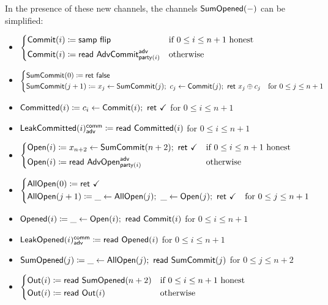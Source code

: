 \noindent In the presence of these new channels, the channels $\mathsf{SumOpened}(-)$ can be simplified:

\begin{itemize}
\item {\color{blue} $\begin{cases*} \Commit(i) \coloneqq \samp{\flip} & \text{if $0 \leq i \leq n+1$ honest} \\ \Commit(i) \coloneqq \read{\AdvCommit^\adv_{\party(i)}} & \text{otherwise} \end{cases*}$}
\item {\color{blue} $\begin{cases*} \SumCommit(0) \coloneqq \ret{\false} & \\ \SumCommit(j+1) \coloneqq x_j \leftarrow \SumCommit(j); \ c_j \leftarrow \Commit(j); \ \ret{x_j \oplus c_j} & \text{for $0 \leq j \leq n+1$} \end{cases*}$}
\item {\color{magenta} $\mathsf{Committed}(i) \coloneqq c_i \leftarrow \mathsf{Commit}(i); \ \mathsf{ret} \ \checkmark$ for $0 \leq i \leq n+1$}
\item {\color{magenta} $\mathsf{LeakCommitted}(i)^{\mathsf{comm}}_{\mathsf{adv}} \coloneqq \mathsf{read} \ \mathsf{Committed}(i)$ for $0 \leq i \leq n+1$}
\item {\color{teal} $\begin{cases*} \Open(i) \coloneqq x_{n+2} \leftarrow \SumCommit(n+2); \ \ret{\checkmark} & \text{if $0 \leq i \leq n+1$ honest} \\ \Open(i) \coloneqq \read{\AdvOpen^\adv_{\party(i)}} & \text{otherwise} \end{cases*}$}
\item {\color{teal} $\begin{cases*} \AllOpen(0) \coloneqq \ret{\checkmark} & \\ \AllOpen(j+1) \coloneqq \_ \leftarrow \AllOpen(j); \ \_ \leftarrow \Open(j); \ \ret{\checkmark} & \text{for $0 \leq j \leq n+1$} \end{cases*}$}
\item {\color{red} $\mathsf{Opened}(i) \coloneqq \_ \leftarrow \mathsf{Open}(i); \ \mathsf{read} \ \mathsf{Commit}(i)$ for $0 \leq i \leq n+1$}
\item {\color{red} $\mathsf{LeakOpened}(i)^{\mathsf{comm}}_{\mathsf{adv}} \coloneqq \mathsf{read} \ \mathsf{Opened}(i)$ for $0 \leq i \leq n+1$}
\item {\color{red} $\mathsf{SumOpened}(j) \coloneqq \_ \leftarrow \mathsf{AllOpen}(j); \ \mathsf{read} \ \mathsf{SumCommit}(j)$ for $0 \leq j \leq n+2$}
\item $\begin{cases*} \Out(i) \coloneqq \read{\SumOpened(n+2)} & \text{if $0 \leq i \leq n+1$ honest} \\ \Out(i) \coloneqq \read{\Out(i)} & \text{otherwise} \end{cases*}$
\end{itemize}

